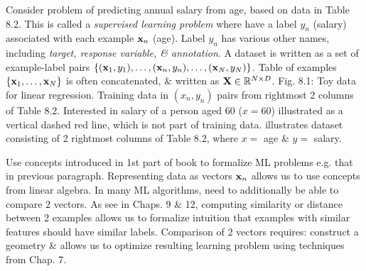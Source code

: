 \documentclass{article}
\begin{document}
\begin{itemize}
\begin{itemize}
\begin{itemize}
			Consider problem of predicting annual salary from age, based on data in Table 8.2. This is called a {\it supervised learning problem} where have a label $y_n$ (salary) associated with each example ${\bf x}_n$ (age). Label $y_n$ has various other names, including {\it target, response variable, \& annotation}. A dataset is written as a set of example-label pairs $\{({\bf x}_1,y_1),\ldots,({\bf x}_n,y_n),\ldots,({\bf x}_N,y_N)\}$. Table of examples $\{{\bf x}_1,\ldots,{\bf x}_N\}$ is often concatenated, \& written as ${\bf X}\in\mathbb{R}^{N\times D}$. {\sf Fig. 8.1: Toy data for linear regression. Training data in $(x_n,y_n)$ pairs from rightmost 2 columns of Table 8.2. Interested in salary of a person aged 60 ($x = 60$) illustrated as a vertical dashed red line, which is not part of training data.} illustrates dataset consisting of 2 rightmost columns of Table 8.2, where $x =$ age \& $y =$ salary.
			
			Use concepts introduced in 1st part of book to formalize ML problems e.g. that in previous paragraph. Representing data as vectors ${\bf x}_n$ allows us to use concepts from linear algebra. In many ML algorithms, need to additionally be able to compare 2 vectors. As see in Chaps. 9 \& 12, computing similarity or distance between 2 examples allows us to formalize intuition that examples with similar features should have similar labels. Comparison of 2 vectors requires: construct a geometry \& allows us to optimize resulting learning problem using techniques from Chap. 7.
			

\end{itemize}
\end{itemize}
\end{itemize}
\end{document}

